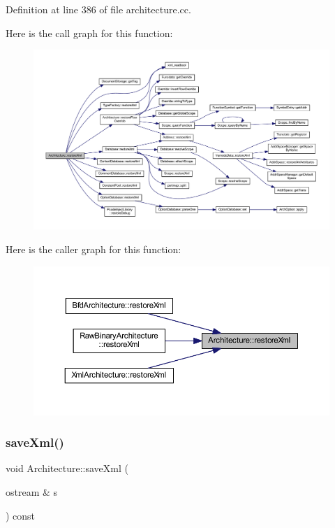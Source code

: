 Definition at line 386 of file architecture.\+cc.

Here is the call graph for this function\+:
\nopagebreak
\begin{figure}[H]
\begin{center}
\leavevmode
\includegraphics[width=350pt]{class_architecture_ab15a398b9f84dd62ad36d1e83895783a_cgraph}
\end{center}
\end{figure}
Here is the caller graph for this function\+:
\nopagebreak
\begin{figure}[H]
\begin{center}
\leavevmode
\includegraphics[width=350pt]{class_architecture_ab15a398b9f84dd62ad36d1e83895783a_icgraph}
\end{center}
\end{figure}
\mbox{\label{class_architecture_af760a127622d4cdd4b6b436122478cb5}} 
\subsubsection{\texorpdfstring{saveXml()}{saveXml()}}
{\footnotesize\ttfamily void Architecture\+::save\+Xml (\begin{DoxyParamCaption}\item[{ostream \&}]{s }\end{DoxyParamCaption}) const\hspace{0.3cm}{\ttfamily [virtual]}}



